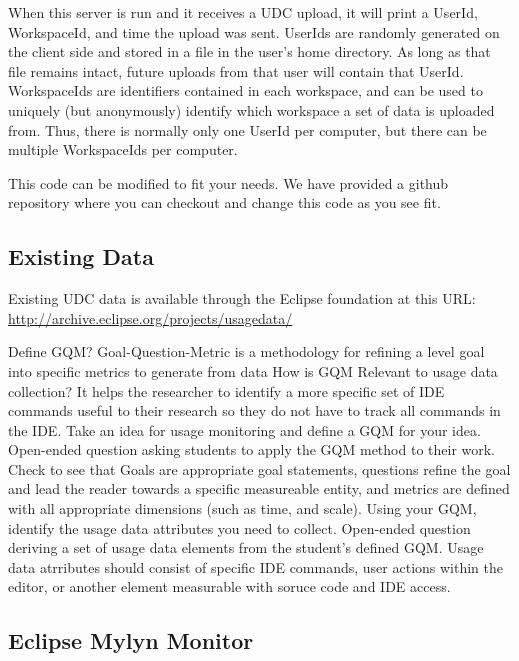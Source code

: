 \noindent
When this server is run and it receives a UDC upload, 
it will print a UserId, WorkspaceId, and time the upload was sent.
UserIds are randomly generated on the client side and stored in a file in
the user's home directory. 
As long as that file remains intact, future uploads from that user will
contain that UserId.
WorkspaceIds are identifiers contained in each workspace, and can be 
used to uniquely (but anonymously) identify which 
workspace a set of data is uploaded from.
Thus, there is normally only one UserId per computer, but there can
be multiple WorkspaceIds per computer.

This code can be modified to fit your needs.
We have provided a github repository where you can checkout 
and change this code as you see fit.

\subsection{Existing Data}

Existing UDC data is available through the Eclipse foundation at this URL:
\url{http://archive.eclipse.org/projects/usagedata/}

\begin{ExerciseList}
 \Exercise[type={long}, difficulty={0}]Define GQM?
  \Answer Goal-Question-Metric is a methodology for refining a level goal into specific metrics to generate from data
 \Exercise[ type={long}, difficulty={1}]How is GQM Relevant to usage data collection?
  \Answer It helps the researcher to identify a more specific set of IDE commands useful to their research so they do not have to track all commands in the IDE.
  \Exercise[ type={long}, difficulty={2}]Take an idea for usage monitoring and define a GQM for your idea.
  \Answer Open-ended question asking students to apply the GQM method to their work.  Check to see that Goals are appropriate goal statements, questions refine the goal and lead the reader towards a specific measureable entity, and metrics are defined with all appropriate dimensions (such as time, and scale).
  \Exercise[ type={long}, difficulty={2}]Using your GQM, identify the usage data attributes you need to collect.
  \Answer Open-ended question deriving a set of usage data elements from the student's defined GQM.  Usage data atrributes should consist of specific IDE commands, user actions within the editor, or another element measurable with soruce code and IDE access.

\end{ExerciseList}


\subsection{Eclipse Mylyn Monitor}
